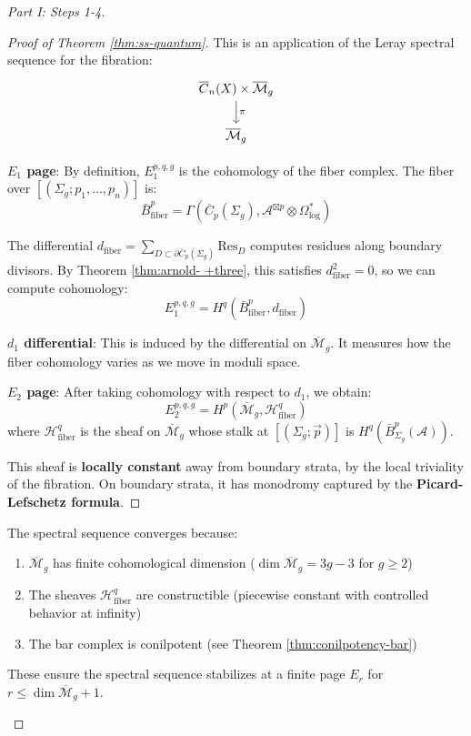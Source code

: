 \begin{proof}[Part I: Steps 1-4]
\begin{proof}[Proof of Theorem \ref{thm:ss-quantum}]
This is an application of the Leray spectral sequence for the fibration:
\begin{equation}
\begin{tikzcd}
\overline{C}_n(X) \times \overline{\mathcal{M}}_g \arrow[d, "\pi"] \\
\overline{\mathcal{M}}_g
\end{tikzcd}
\end{equation}

\textbf{$E_1$ page}: By definition, $E_1^{p,q,g}$ is the cohomology of the fiber 
complex. The fiber over $[(\Sigma_g; p_1, \ldots, p_n)]$ is:
\begin{equation}
\bar{B}^p_{\text{fiber}} = \Gamma(\overline{C}_p(\Sigma_g), \mathcal{A}^{\boxtimes p} 
\otimes \Omega^*_{\log})
\end{equation}

The differential $d_{\text{fiber}} = \sum_{D \subset \partial \overline{C}_p(\Sigma_g)} 
\text{Res}_D$ computes residues along boundary divisors. By Theorem \ref{thm:arnold-
+three}, this satisfies $d_{\text{fiber}}^2 = 0$, so we can compute cohomology:
\begin{equation}
E_1^{p,q,g} = H^q(\bar{B}^p_{\text{fiber}}, d_{\text{fiber}})
\end{equation}

\textbf{$d_1$ differential}: This is induced by the differential on $\overline{
\mathcal{M}}_g$. It measures how the fiber cohomology varies as we move in moduli space.

\textbf{$E_2$ page}: After taking cohomology with respect to $d_1$, we obtain:
\begin{equation}
E_2^{p,q,g} = H^p(\overline{\mathcal{M}}_g, \mathcal{H}^q_{\text{fiber}})
\end{equation}
where $\mathcal{H}^q_{\text{fiber}}$ is the sheaf on $\overline{\mathcal{M}}_g$ whose 
stalk at $[(\Sigma_g; \vec{p})]$ is $H^q(\bar{B}^p_{\Sigma_g}(\mathcal{A}))$.

This sheaf is \textbf{locally constant} away from boundary strata, by the local 
triviality of the fibration. On boundary strata, it has monodromy captured by the 
\textbf{Picard-Lefschetz formula}.
\end{proof}

\begin{remark}[Convergence]
The spectral sequence converges because:
\begin{enumerate}
\item $\overline{\mathcal{M}}_g$ has finite cohomological dimension ($\dim 
\overline{\mathcal{M}}_g = 3g-3$ for $g \geq 2$)
\item The sheaves $\mathcal{H}^q_{\text{fiber}}$ are constructible (piecewise constant 
with controlled behavior at infinity)
\item The bar complex is conilpotent (see Theorem \ref{thm:conilpotency-bar})
\end{enumerate}
These ensure the spectral sequence stabilizes at a finite page $E_r$ for $r \leq 
\dim \overline{\mathcal{M}}_g + 1$.
\end{remark}


\end{proof}
